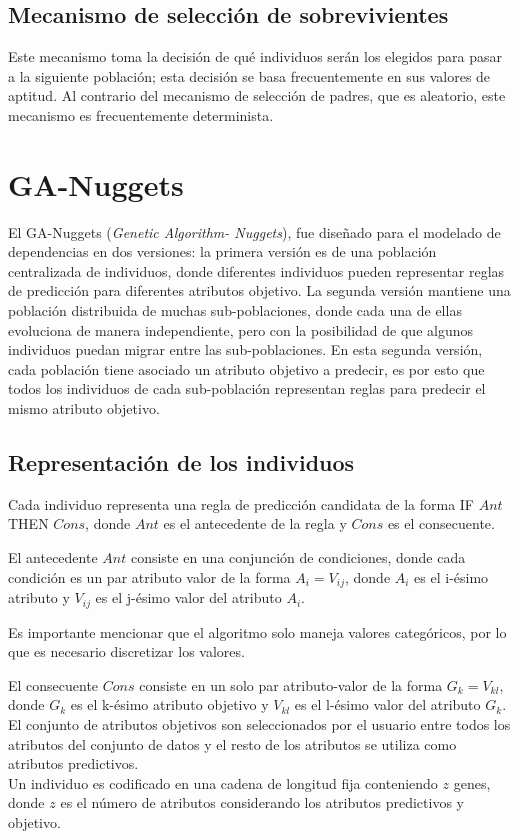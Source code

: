 \subsection{Mecanismo de selección de sobrevivientes}

Este mecanismo toma la decisión de qué individuos serán los elegidos para pasar a la siguiente población; esta decisión se basa frecuentemente en sus valores de aptitud. Al contrario del mecanismo de selección de padres, que es aleatorio, este mecanismo es frecuentemente determinista. 

\section{GA-Nuggets}

El GA-Nuggets (\textit{Genetic Algorithm- Nuggets}), fue diseñado para el modelado de dependencias en dos versiones: la primera versión es de una población centralizada de individuos, donde diferentes individuos pueden representar reglas de predicción para diferentes atributos objetivo. La segunda versión mantiene una población distribuida de muchas sub-poblaciones, donde cada una de ellas evoluciona de manera independiente, pero con la posibilidad de que algunos individuos puedan migrar entre las sub-poblaciones. En esta segunda versión, cada población tiene asociado un atributo objetivo a predecir, es por esto que todos los individuos de cada sub-población representan reglas para predecir el mismo atributo objetivo.

\subsection{Representación de los individuos}

Cada individuo representa una regla de predicción candidata de la forma IF $Ant$ THEN $Cons$, donde $Ant$ es el antecedente de la regla y $Cons$ es el consecuente.

El antecedente $Ant$ consiste en una conjunción de condiciones, donde cada condición es un par atributo valor de la forma $A_i = V_{ij}$, donde $A_i$ es el i-ésimo atributo y $V_{ij}$ es el j-ésimo valor del atributo $A_i$.

Es importante mencionar que el algoritmo solo maneja valores categóricos, por lo que es necesario discretizar los valores.

El consecuente $Cons$ consiste en un solo par atributo-valor de la forma $G_k = V_{kl}$, donde $G_k$ es el k-ésimo atributo objetivo y $V_{kl}$ es el l-ésimo valor del atributo $G_k$. El conjunto de atributos objetivos son seleccionados por el usuario entre todos los atributos del conjunto de datos y el resto de los atributos se utiliza como atributos predictivos.
\\
Un individuo es codificado en una cadena de longitud fija conteniendo $z$ genes, donde $z$ es el número de atributos considerando los atributos predictivos y objetivo.

